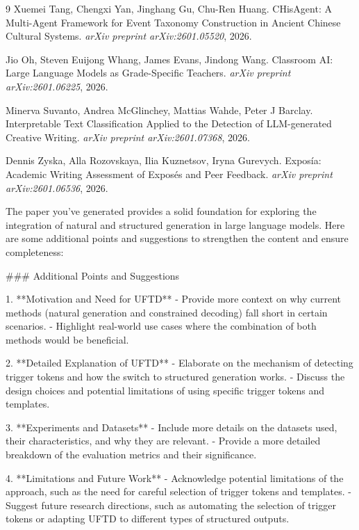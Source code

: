 \begin{thebibliography}{9}
Xuemei Tang, Chengxi Yan, Jinghang Gu, Chu-Ren Huang. \newblock CHisAgent: A Multi-Agent Framework for Event Taxonomy Construction in Ancient Chinese Cultural Systems. \newblock \emph{arXiv preprint arXiv:2601.05520}, 2026.

Jio Oh, Steven Euijong Whang, James Evans, Jindong Wang. \newblock Classroom AI: Large Language Models as Grade-Specific Teachers. \newblock \emph{arXiv preprint arXiv:2601.06225}, 2026.

Minerva Suvanto, Andrea McGlinchey, Mattias Wahde, Peter J Barclay. \newblock Interpretable Text Classification Applied to the Detection of LLM-generated Creative Writing. \newblock \emph{arXiv preprint arXiv:2601.07368}, 2026.

Dennis Zyska, Alla Rozovskaya, Ilia Kuznetsov, Iryna Gurevych. \newblock Expos\'ia: Academic Writing Assessment of Expos\'es and Peer Feedback. \newblock \emph{arXiv preprint arXiv:2601.06536}, 2026.

\end{thebibliography} The paper you've generated provides a solid foundation for exploring the integration of natural and structured generation in large language models. Here are some additional points and suggestions to strengthen the content and ensure completeness:

### Additional Points and Suggestions

1. **Motivation and Need for UFTD**
   - Provide more context on why current methods (natural generation and constrained decoding) fall short in certain scenarios.
   - Highlight real-world use cases where the combination of both methods would be beneficial.

2. **Detailed Explanation of UFTD**
   - Elaborate on the mechanism of detecting trigger tokens and how the switch to structured generation works.
   - Discuss the design choices and potential limitations of using specific trigger tokens and templates.

3. **Experiments and Datasets**
   - Include more details on the datasets used, their characteristics, and why they are relevant.
   - Provide a more detailed breakdown of the evaluation metrics and their significance.

4. **Limitations and Future Work**
   - Acknowledge potential limitations of the approach, such as the need for careful selection of trigger tokens and templates.
   - Suggest future research directions, such as automating the selection of trigger tokens or adapting UFTD to different types of structured outputs.

